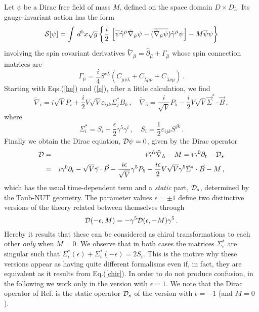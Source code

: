 \documentclass[a4paper,12pt]{article}
\begin{document}
Let $\psi$ be a Dirac free field of  mass $M$, defined on the  space 
domain $D\times D_{5}$. Its gauge-invariant action  \cite{DKK} has the form     
\begin{equation}\label{(action)}
{\cal S}[\psi]=\int\, d^{5}x\sqrt{g}\left\{
\frac{i}{2}\,\left[\overline{\psi}\tilde\gamma^{\hat\mu}
\tilde\nabla_{\hat\mu}\psi-
(\overline{\tilde\nabla_{\hat\mu}\psi})\tilde\gamma^{\hat\mu}\psi
\right] - 
 M\overline{\psi}\psi\right\}
\end{equation}
involving the spin covariant derivatives 
$\tilde\nabla_{\hat\mu}=\hat\partial_{\hat\mu}+\Gamma_{\hat\mu}$ whose  
spin connection matrices are 
\begin{equation}\label{con}
\Gamma_{\hat\mu}
=\frac{i}{4}S^{\hat\nu \hat\lambda}(C_{\hat\mu \hat\nu \hat\lambda}+
C_{\hat\lambda \hat\mu \hat\nu}+C_{\hat\lambda \hat\nu \hat\mu})\,.
\end{equation}
Starting with  Eqs.(\ref{he}) and  (\ref{e}), after a little calculation,
we find  
\begin{equation}\label{sder}
\tilde \nabla_{i}=i\sqrt{V}P_{i}+\frac{i}{2}V\sqrt{V}\varepsilon_{ijk}
\Sigma_{j}^{*}B_{k}\,,\quad
\tilde \nabla_{5}=\frac{i}{\sqrt{V}}P_{5}-\frac{i}{2}V\sqrt{V}
\vec{\Sigma}^{*}\cdot\vec{B}\,,
\end{equation}
where
\begin{equation}
\Sigma_{i}^{*}=S_{i}+\frac{\epsilon}{2}\gamma^{5}\gamma^{i}\,,\quad
S_{i}=\frac{1}{2}\varepsilon_{ijk}S^{jk}\,. 
\end{equation}
Finally we obtain the Dirac equation, ${\cal D}\psi=0$, 
given by the Dirac operator  \cite{DIRAC} 
\begin{eqnarray}
{\cal D}&=&i\tilde\gamma^{\hat\alpha}\tilde\nabla_{\hat\alpha} - 
M\nonumber=i\gamma^{0}\partial_{t}-{\cal D}_{s}\\ 
&=&i\gamma^{0}\partial_{t} - \sqrt{V}\vec{\gamma}\cdot\vec{P}
-\frac{i\epsilon}{\sqrt{V}}\gamma^{5}P_{5}
-\frac{i\epsilon}{2} V\sqrt{V}\gamma^{5}\vec{\Sigma}^{*}\cdot\vec{B}-
M\,,\label{(de)}
\end{eqnarray}
which has the usual time-dependent term \cite{TH} and a {\em static} part, 
${\cal D}_{s}$, determined by the Taub-NUT geometry. 
The parameter values $\epsilon=\pm 1$ define two distinctive  versions of the 
theory related between themselves through
\begin{equation}\label{chir}
{\cal D}(-\epsilon, M)=-\gamma^{5} 
{\cal D}(\epsilon, -M)\gamma^{5}\,. 
\end{equation}
Hereby it results that these can be considered as chiral transformations to 
each other {\em only} when $M=0$.  We observe that in both cases the matrices 
$\Sigma_{i}^{*}$ are singular such that 
$\Sigma_{i}^{*}(\epsilon)+\Sigma_{i}^{*}(-\epsilon)=2S_{i}$. This is the motive 
why these versions appear as having quite different formalisms even if, in fact, 
they are equivalent as it results from Eq.(\ref{chir}). In order to do not 
produce confusion, in the following we work only in the version with 
$\epsilon=1$. We note that the Dirac operator of Ref.\cite{CH} is the static 
operator ${\cal D}_{s}$ of the version with $\epsilon=-1$ (and $M=0$).
 
\end{document}
